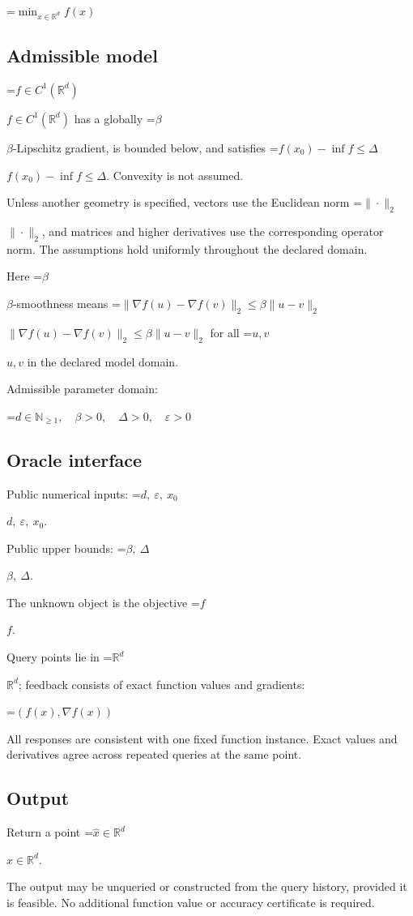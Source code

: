 \documentclass[10pt,a4paper]{article}
\newcommand{\AtlasMath}[1]{\par\begingroup\centering\setbox0=\hbox{$\displaystyle #1$}\ifdim\wd0>1.4\linewidth\typeout{ATLAS WIDE FORMULA: \the\wd0}\fi\ifdim\wd0>\linewidth\resizebox{\linewidth}{!}{\box0}\else\box0\fi\par\endgroup}
\newcommand{\AtlasInlineMath}[1]{\begingroup\setbox0=\hbox{$#1$}\ifdim\wd0>.4\linewidth\endgroup\AtlasMath{#1}\else\endgroup$#1$\fi}
\begin{document}
\AtlasMath{\min_{x\in \mathbb{R}^d}f(x)}


\subsection{Admissible model}
\AtlasInlineMath{f\in C^1(\mathbb R^d)} has a globally \AtlasInlineMath{\beta}-Lipschitz gradient, is bounded below, and satisfies \AtlasInlineMath{f(x_0)-\inf f\le\Delta}. Convexity is not assumed.

Unless another geometry is specified, vectors use the Euclidean norm \AtlasInlineMath{\|\cdot\|_2}, and matrices and higher derivatives use the corresponding operator norm. The assumptions hold uniformly throughout the declared domain.

Here \AtlasInlineMath{\beta}-smoothness means \AtlasInlineMath{\|\nabla f(u)-\nabla f(v)\|_2\le\beta\|u-v\|_2} for all \AtlasInlineMath{u,v} in the declared model domain.

Admissible parameter domain:


\AtlasMath{d\in\mathbb{N}_{\ge1},\quad \beta>0,\quad \Delta>0,\quad \varepsilon>0}


\subsection{Oracle interface}
Public numerical inputs: \AtlasInlineMath{d,\ \varepsilon,\ x_0}.

Public upper bounds: \AtlasInlineMath{\beta,\ \Delta}.

The unknown object is the objective \AtlasInlineMath{f}.

Query points lie in \AtlasInlineMath{\mathbb{R}^d}; feedback consists of exact function values and gradients:


\AtlasMath{(f(x),\nabla f(x))}


All responses are consistent with one fixed function instance. Exact values and derivatives agree across repeated queries at the same point.

\subsection{Output}
Return a point \AtlasInlineMath{\widehat x\in\mathbb R^d}.

The output may be unqueried or constructed from the query history, provided it is feasible. No additional function value or accuracy certificate is required.
\end{document}
